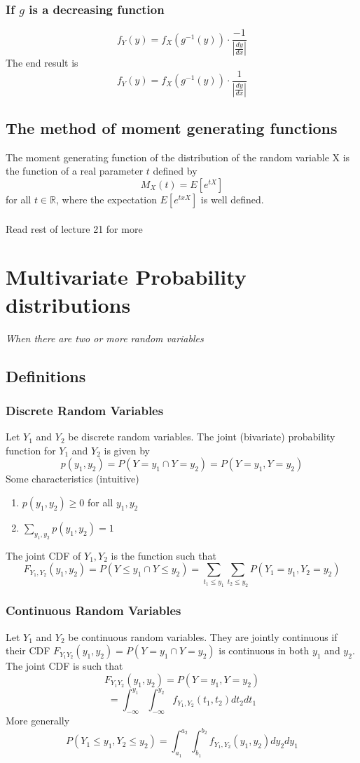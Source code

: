 \documentclass{article}
\begin{document}
\subsubsection{If $g$ is a decreasing function}
\[f_Y(y)=f_X(g^{-1}(y))\cdot\frac{-1}{|\frac{dy}{dx}|}\]
The end result is
\[f_Y(y)=f_X(g^{-1}(y))\cdot\frac{1}{|\frac{dy}{dx}|}\]
\subsection{The method of moment generating functions}
The moment generating function of the distribution of the random variable X is the function of a real parameter $t$ defined by
\[M_X(t)=E[e^{tX}]\]
for all $t\in\mathds{R}$, where the expectation $E[e^{txX}]$ is well defined.\\\\
Read rest of lecture 21 for more
\section{Multivariate Probability distributions}
\textit{When there are two or more random variables}
\subsection{Definitions}
\subsubsection{Discrete Random Variables}
Let $Y_1$ and $Y_2$ be discrete random variables. The joint (bivariate) probability function for $Y_1$ and $Y_2$ is given by 
\[p(y_1,y_2)=P(Y=y_1\cap Y=y_2)=P(Y=y_1, Y=y_2)\]
Some characteristics (intuitive)
\begin{enumerate}
    \item $p(y_1,y_2)\geq0$ for all $y_1,y_2$
    \item $\sum_{y_1,y_2}p(y_1,y_2)=1$
\end{enumerate}
The joint CDF of $Y_1,Y_2$ is the function such that
\[F_{Y_1,Y_2}(y_1,y_2)=P(Y\leq y_1\cap Y\leq y_2)=\sum_{t_1\leq y_1}\sum_{t_2\leq y_2}P(Y_1=y_1,Y_2=y_2)\]
\subsubsection{Continuous Random Variables}
Let $Y_1$ and $Y_2$ be continuous random variables. They are jointly continuous if their CDF $F_{Y_1Y_2}(y_1,y_2)=P(Y=y_1\cap Y=y_2)$ is continuous in both $y_1$ and $y_2$. The joint CDF is such that
\[F_{Y_1Y_2}(y_1,y_2)=P(Y=y_1, Y=y_2)\]
\[=\int^{y_1}_{-\infty}\int^{y_2}_{-\infty}f_{Y_1,Y_2}(t_1,t_2)dt_2dt_1\]
More generally
\[P(Y_1\leq y_1, Y_2 \leq y_2) = \int^{a_2}_{a_1}\int^{b_2}_{b_1}f_{Y_1,Y_2}(y_1,y_2)dy_2dy_1\]
\end{document}

